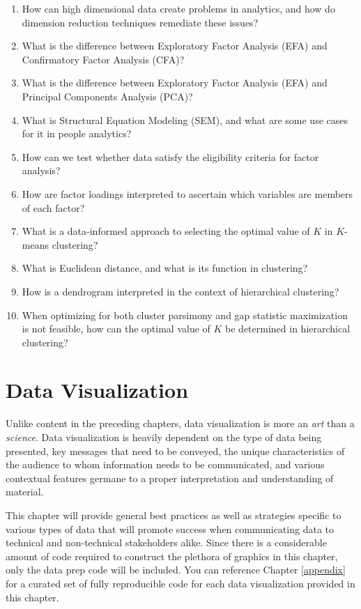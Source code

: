 \documentclass[
]{book}
\begin{document}
\begin{enumerate}
\def\labelenumi{\arabic{enumi}.}
\item
  How can high dimensional data create problems in analytics, and how do dimension reduction techniques remediate these issues?
\item
  What is the difference between Exploratory Factor Analysis (EFA) and Confirmatory Factor Analysis (CFA)?
\item
  What is the difference between Exploratory Factor Analysis (EFA) and Principal Components Analysis (PCA)?
\item
  What is Structural Equation Modeling (SEM), and what are some use cases for it in people analytics?
\item
  How can we test whether data satisfy the eligibility criteria for factor analysis?
\item
  How are factor loadings interpreted to ascertain which variables are members of each factor?
\item
  What is a data-informed approach to selecting the optimal value of \(K\) in \(K\)-means clustering?
\item
  What is Euclidean distance, and what is its function in clustering?
\item
  How is a dendrogram interpreted in the context of hierarchical clustering?
\item
  When optimizing for both cluster parsimony and gap statistic maximization is not feasible, how can the optimal value of \(K\) be determined in hierarchical clustering?
\end{enumerate}

\hypertarget{data-viz}{%
\chapter{Data Visualization}\label{data-viz}}

Unlike content in the preceding chapters, data visualization is more an \emph{art} than a \emph{science}. Data visualization is heavily dependent on the type of data being presented, key messages that need to be conveyed, the unique characteristics of the audience to whom information needs to be communicated, and various contextual features germane to a proper interpretation and understanding of material.

This chapter will provide general best practices as well as strategies specific to various types of data that will promote success when communicating data to technical and non-technical stakeholders alike. Since there is a considerable amount of code required to construct the plethora of graphics in this chapter, only the data prep code will be included. You can reference Chapter \ref{appendix} for a curated set of fully reproducible code for each data visualization provided in this chapter.
\end{document}
